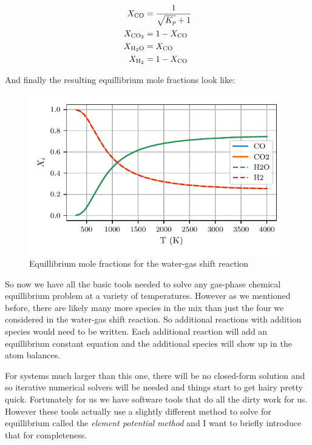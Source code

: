 \documentclass[twocolumn]{memoir} %
\begin{document}
\begin{equation}
    \begin{split}
        X_{\ce{CO}} &= \frac{1}{\sqrt{K_p} + 1}\\
        X_{\ce{CO2}} &= 1 - X_{\ce{CO}} \\
        X_{\ce{H2O}} &= X_{\ce{CO}}\\
        X_{\ce{H2}} &= 1 - X_{\ce{CO}}
    \end{split}
\end{equation}

And finally the resulting equillibrium mole fractions look like:

\begin{figure}[H]
    \includegraphics[width=\columnwidth]{wgs_Xi}
    \caption{Equillibrium mole fractions for the water-gas shift reaction}
\end{figure}

So now we have all the basic tools needed to solve any gas-phase chemical equillibrium problem at
a variety of temperatures.  However as we mentioned before, there are likely many more species in
the mix than just the four we considered in the water-gas shift reaction.  So additional reactions
with addition species would need to be written.  Each additional reaction will add an equillibrium
constant equation and the additional species will show up in the atom balances.  

For systems much
larger than this one, there will be no closed-form solution and so iterative numerical solvers
will be needed and things start to get hairy pretty quick.  Fortunately for us we have software
tools that do all the dirty work for us.  However these tools actually use a slightly different
method to solve for equillibrium called the \emph{element potential method} and I want to briefly
introduce that for completeness.
\end{document}
